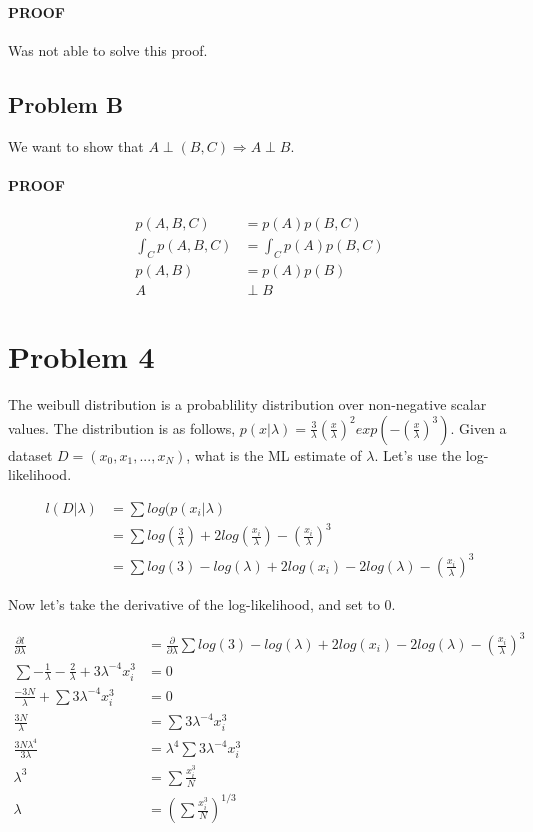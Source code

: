 \documentclass[paper=a4, fontsize=11pt]{scrartcl} %
\begin{document}
\paragraph{PROOF}
Was not able to solve this proof.  

\subsection{Problem B}
We want to show that $A \perp (B,C) \Rightarrow A \perp B$.

\paragraph{PROOF}

\begin{align}
p(A,B,C) &= p(A)p(B,C) \\
\int_C  p(A,B,C) &= \int_C p(A)p(B,C) \\
p(A,B) &= p(A)p(B) \\
A &\perp B 
\end{align}


\section{Problem 4}
The weibull distribution is a probablility distribution over non-negative scalar values.  
The distribution is as follows,  $p(x|\lambda) = \frac{3}{\lambda}(\frac{x}{\lambda})^2exp(-(\frac{x}{\lambda})^3)$.
Given a dataset $D = (x_0,x_1,...,x_N)$, what is the ML estimate of $\lambda$.
Let's use the log-likelihood.

\begin{align}
l(D|\lambda) &= \sum log(p(x_i|\lambda) \\
&= \sum log(\frac{3}{\lambda})+2log(\frac{x_i}{\lambda})-(\frac{x_i}{\lambda})^3 \\
&= \sum log(3) - log(\lambda) +2log(x_i) - 2log(\lambda) -(\frac{x_i}{\lambda})^3 
\end{align}

Now let's take the derivative of the log-likelihood, and set to 0.

\begin{align}
\frac{\partial l}{\partial \lambda} &=\frac{\partial}{\partial \lambda} \sum log(3) - log(\lambda) +2log(x_i) - 2log(\lambda) -(\frac{x_i}{\lambda})^3 \\
\sum -\frac{1}{\lambda} - \frac{2}{\lambda}  + 3\lambda^{-4}x_i^{3} &= 0 \\
\frac{-3N}{\lambda} + \sum 3\lambda^{-4}x_i^{3} &= 0 \\
 \frac{3N}{\lambda} &=  \sum 3\lambda^{-4}x_i^{3} \\ 
\frac{3N\lambda^4}{3\lambda} &= \lambda^4 \sum 3\lambda^{-4}x_i^{3} \\
\lambda^3 &= \sum \frac{x_i^{3}}{N} \\
\lambda &= (\sum \frac{x_i^{3}}{N})^{1/3}
\end{align}
\end{document}
